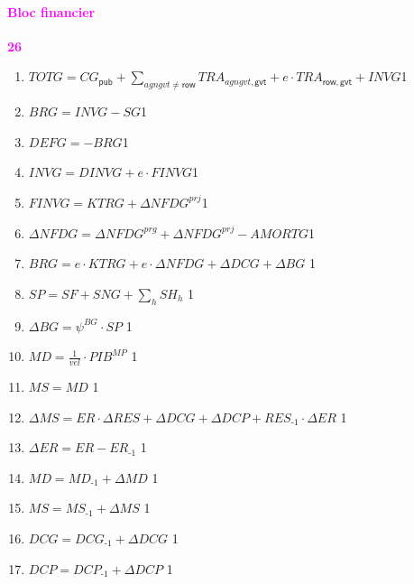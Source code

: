 \documentclass[11pt,a4paper]{article}
\newcommand{\agngvt}{\mathit{agngvt}}
\newcommand{\vel}{\mathit{vel}}
\newcommand{\gvt}{\mathsf{gvt}}
\newcommand{\row}{\mathsf{row}}
\newcommand{\CG}{\mathit{CG}}
\newcommand{\DEFG}{\mathit{DEFG}}
\newcommand{\BRG}{\mathit{BRG}}
\newcommand{\TOTG}{\mathit{TOTG}}
\newcommand{\DINVG}{\mathit{DINVG}}
\newcommand{\FINVG}{\mathit{FINVG}}
\newcommand{\SNG}{\mathit{SNG}}
\newcommand{\SF}{\mathit{SF}}
\newcommand{\SG}{\mathit{SG}}
\newcommand{\SH}{\mathit{SH}}
\newcommand{\pub}{\mathsf{pub}}
\newcommand{\TR}{\mathit{TRA}}
\newcommand{\redparagraph}[1]{\paragraph*{\large\textcolor{Fuchsia}{#1}}}
\newcommand{\PIB}{\mathit{PIB}}
\newcommand{\INVG}{\mathit{INVG}}
\newcommand{\KTRG}{\mathit{KTRG}}
\newcommand{\NFDG}{\mathit{NFDG}}
\newcommand{\DCG}{\mathit{DCG}}
\newcommand{\BG}{\mathit{BG}}
\newcommand{\AMORTG}{\mathit{AMORTG}}
\newcommand{\SP}{\mathit{SP}}
\newcommand{\RES}{\mathit{RES}}
\newcommand{\MS}{\mathit{MS}}
\newcommand{\MD}{\mathit{MD}}
\newcommand{\DCP}{\mathit{DCP}}
\newcommand{\ER}{\mathit{ER}}
\begin{document}
	
	\redparagraph{Bloc financier}\hfill \textcolor{Fuchsia}{\textbf{26}} 
	\begin{enumerate}[itemsep=2pt,label=\textbf{eqfin\arabic*}.,  ref=\textbf{eqfin\arabic*}]
		
		\item $\TOTG = \CG_{\pub} + \sum_{\agngvt\neq\row} \TR_{\agngvt,\gvt} + e\cdot\TR_{\row,\gvt} + \INVG$\hfill 1
		
		\item $\BRG = \INVG - \SG $\hfill 1
		
		\item $\DEFG = - \BRG $\hfill 1
		
		\item $\INVG = \DINVG + e\cdot\FINVG $\hfill 1
		
		\item $\FINVG = \KTRG + \Delta\NFDG^{\textit{prj}} $\hfill 1
		
		\item $\Delta\NFDG = \Delta\NFDG^{\textit{prg}} + \Delta\NFDG^{\textit{prj}} -\AMORTG$\hfill 1
		
		\item $\BRG = e\cdot\KTRG + e\cdot\Delta\NFDG + \Delta\DCG + \Delta\BG$ \hfill 1
		
		\item $\SP = \SF + \SNG + \sum_{h} \SH_h$ \hfill 1
		
		\item $\Delta\BG = \psi^{\BG}\cdot \SP$ \hfill 1
		\item $\MD = \frac{1}{\vel}\cdot \PIB^{\textit{MP}}$ \hfill 1
		
		\item 	$\MS = \MD$	\hfill 1
		
		\item 	$\Delta\MS  = \ER\cdot \Delta \RES + \Delta\DCG + \Delta\DCP + \RES_{\textit{-1}}\cdot\Delta\ER$ \hfill 1	
		
		\item 	$\Delta\ER  = \ER -\ER_{\textit{-1}}$ \hfill 1				
		
		\item 	$\MD  = \MD_{\textit{-1}} + \Delta \MD$ \hfill 1				
		
		\item 	$\MS  = \MS_{\textit{-1}} + \Delta \MS$ \hfill 1	
		
		\item 	$\DCG  = \DCG_{\textit{-1}} + \Delta \DCG$ \hfill 1		
		
		\item 	$\DCP  = \DCP_{\textit{-1}} + \Delta \DCP$ \hfill 1												
		

\end{enumerate}
\end{document}

